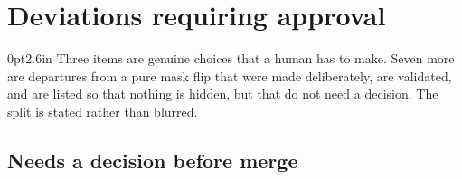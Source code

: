 \documentclass[10pt]{article}
\newenvironment{prose}{\begin{adjustwidth}{0pt}{2.6in}}{\end{adjustwidth}}
\begin{document}
\clearpage
\section{Deviations requiring approval}\label{sec:dev}

\begin{prose}
Three items are genuine choices that a human has to make. Seven more are departures from a pure mask
flip that were made deliberately, are validated, and are listed so that nothing is hidden, but that do
not need a decision. The split is stated rather than blurred.
\end{prose}

\subsection*{Needs a decision before merge}
\end{document}
